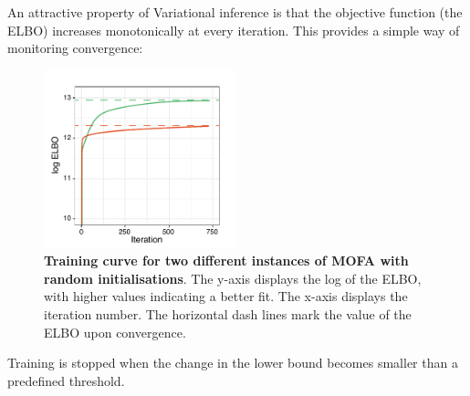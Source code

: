 An attractive property of Variational inference is that the objective function (the ELBO) increases monotonically at every iteration. This provides a simple way of monitoring convergence:
\begin{figure}[H]
	\centering 	
	\includegraphics[width=0.5\textwidth]{elbo_convergence}
	\caption{\textbf{Training curve for two different instances of MOFA with random initialisations}. The y-axis displays the log of the ELBO, with higher values indicating a better fit. The x-axis displays the iteration number. The horizontal dash lines mark the value of the ELBO upon convergence. }
	\label{fig:elbo_convergence}
\end{figure}

Training is stopped when the change in the lower bound becomes smaller than a predefined threshold.



